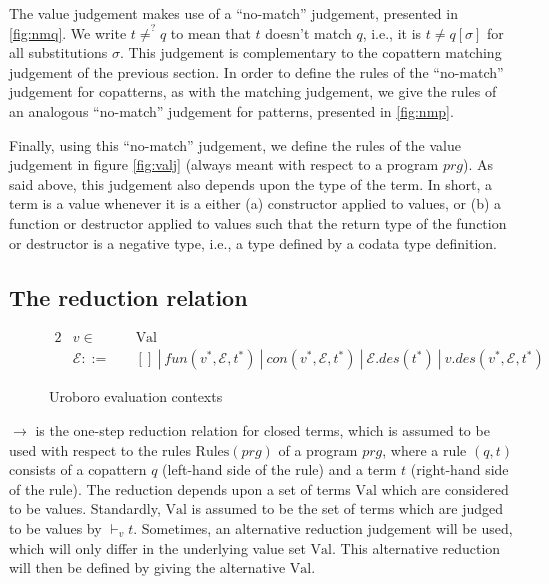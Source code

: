 The value judgement makes use of a ``no-match'' judgement, presented in \autoref{fig:nmq}. We write $t \neq^? q$ to mean that $t$ doesn't match $q$, i.e., it is $t \neq q[\sigma]$ for all substitutions $\sigma$. This judgement is complementary to the copattern matching judgement of the previous section. In order to define the rules of the ``no-match'' judgement for copatterns, as with the matching judgement, we give the rules of an analogous ``no-match'' judgement for patterns, presented in \autoref{fig:nmp}.

Finally, using this ``no-match'' judgement, we define the rules of the value judgement in figure \autoref{fig:valj} (always meant with respect to a program $prg$). As said above, this judgement also depends upon the type of the term. In short, a term is a value whenever it is a either (a) constructor applied to values, or (b) a function or destructor applied to values such that the return type of the function or destructor is a negative type, i.e., a type defined by a codata type definition.

\subsection{The reduction relation}
\label{ssec:red}

\begin{figure}
\begin{alignat*}{2}
& v  \in &&\textrm{Val} \\
& \mathcal{E} ::= ~&& [] ~ | ~ fun(v^*, \mathcal{E}, t^*) ~ | ~ con(v^*, \mathcal{E}, t^*) ~ | ~ \mathcal{E}.des(t^*) ~ | ~ v.des(v^*, \mathcal{E}, t^*)
\end{alignat*}
\caption{Uroboro evaluation contexts}
\label{fig:uroevalc}
\end{figure}

$\longrightarrow$ is the one-step reduction relation for closed terms, which is assumed to be used with respect to the rules $\textrm{Rules}(prg)$ of a program $prg$, where a rule $(q, t)$ consists of a copattern $q$ (left-hand side of the rule) and a term $t$ (right-hand side of the rule). The reduction depends upon a set of terms $\textrm{Val}$ which are considered to be values. Standardly, $\textrm{Val}$ is assumed to be the set of terms which are judged to be values by $\vdash_v t$. Sometimes, an alternative reduction judgement will be used, which will only differ in the underlying value set $\textrm{Val}$. This alternative reduction will then be defined by giving the alternative $\textrm{Val}$.

